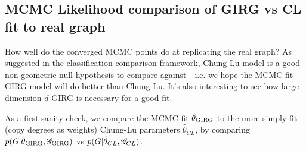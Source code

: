 \subsection{MCMC Likelihood comparison of GIRG vs CL fit to real graph}
How well do the converged MCMC points do at replicating the real graph? As suggested in the classification comparison framework, Chung-Lu model is a good non-geometric null hypothesis to compare against - i.e. we hope the MCMC fit GIRG model will do better than Chung-Lu. It's also interesting to see how large dimension $d$ GIRG is necessary for a good fit.

As a first sanity check, we compare the MCMC fit $\hat{\theta}_{\mathrm{GIRG}}$ to the more simply fit (copy degrees as weights) Chung-Lu parameters $\hat{\theta}_{CL}$, by comparing $p(G | \hat{\theta}_{\mathrm{GIRG}}, \mathscr{G}_{\mathrm{GIRG}})$ vs $p(G | \hat{\theta}_{CL}, \mathscr{G}_{CL})$. 


